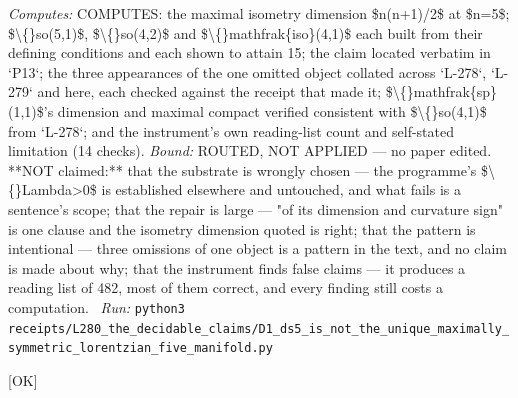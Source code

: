 \begin{description}
\emph{Computes:} COMPUTES: the maximal isometry dimension \$n(n+1)/2\$ at \$n=5\$; \$\textbackslash\{\}so(5,1)\$, \$\textbackslash\{\}so(4,2)\$ and \$\textbackslash\{\}mathfrak\{iso\}(4,1)\$ each built from their defining conditions and each shown to attain 15; the claim located verbatim in `P13`; the three appearances of the one omitted object collated across `L-278`, `L-279` and here, each checked against the receipt that made it; \$\textbackslash\{\}mathfrak\{sp\}(1,1)\$'s dimension and maximal compact verified consistent with \$\textbackslash\{\}so(4,1)\$ from `L-278`; and the instrument's own reading-list count and self-stated limitation (14 checks).
 \emph{Bound:} ROUTED, NOT APPLIED --- no paper edited. **NOT claimed:** that the substrate is wrongly chosen --- the programme's \$\textbackslash\{\}Lambda>0\$ is established elsewhere and untouched, and what fails is a sentence's scope; that the repair is large --- "of its dimension and curvature sign" is one clause and the isometry dimension quoted is right; that the pattern is intentional --- three omissions of one object is a pattern in the text, and no claim is made about why; that the instrument finds false claims --- it produces a reading list of 482, most of them correct, and every finding still costs a computation.
\ \emph{Run:} \texttt{python3 receipts/L280\_the\_decidable\_claims/D1\_ds5\_is\_not\_the\_unique\_maximally\_symmetric\_lorentzian\_five\_manifold.py}
\item[\label{rcpt:P1_a_bake_that_asks_the_papers_and_not_the_receipts_walks_into_a_settled_question}\texttt{P1\_a\_bake\_that\_asks\_the\_papers\_and\_not\_the\_receipts\_walks\_into\_a\_settled\_question}]\hfill\textsf{[OK]}\\

\end{description}
